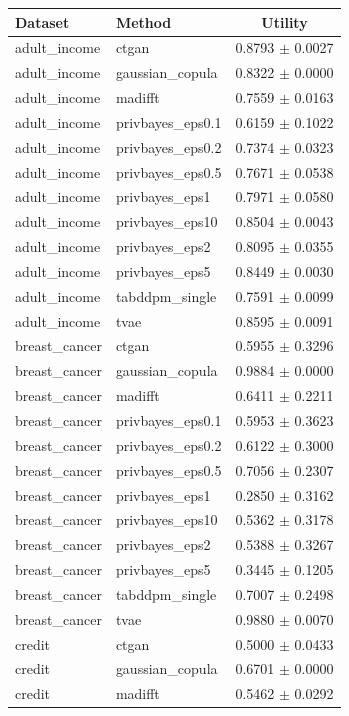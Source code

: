 \begin{tabular}{llc}
\toprule
Dataset & Method & Utility \\
\midrule
adult_income & ctgan & 0.8793 $\pm$ 0.0027 \\
adult_income & gaussian_copula & 0.8322 $\pm$ 0.0000 \\
adult_income & madifft & 0.7559 $\pm$ 0.0163 \\
adult_income & privbayes_eps0.1 & 0.6159 $\pm$ 0.1022 \\
adult_income & privbayes_eps0.2 & 0.7374 $\pm$ 0.0323 \\
adult_income & privbayes_eps0.5 & 0.7671 $\pm$ 0.0538 \\
adult_income & privbayes_eps1 & 0.7971 $\pm$ 0.0580 \\
adult_income & privbayes_eps10 & 0.8504 $\pm$ 0.0043 \\
adult_income & privbayes_eps2 & 0.8095 $\pm$ 0.0355 \\
adult_income & privbayes_eps5 & 0.8449 $\pm$ 0.0030 \\
adult_income & tabddpm_single & 0.7591 $\pm$ 0.0099 \\
adult_income & tvae & 0.8595 $\pm$ 0.0091 \\
breast_cancer & ctgan & 0.5955 $\pm$ 0.3296 \\
breast_cancer & gaussian_copula & 0.9884 $\pm$ 0.0000 \\
breast_cancer & madifft & 0.6411 $\pm$ 0.2211 \\
breast_cancer & privbayes_eps0.1 & 0.5953 $\pm$ 0.3623 \\
breast_cancer & privbayes_eps0.2 & 0.6122 $\pm$ 0.3000 \\
breast_cancer & privbayes_eps0.5 & 0.7056 $\pm$ 0.2307 \\
breast_cancer & privbayes_eps1 & 0.2850 $\pm$ 0.3162 \\
breast_cancer & privbayes_eps10 & 0.5362 $\pm$ 0.3178 \\
breast_cancer & privbayes_eps2 & 0.5388 $\pm$ 0.3267 \\
breast_cancer & privbayes_eps5 & 0.3445 $\pm$ 0.1205 \\
breast_cancer & tabddpm_single & 0.7007 $\pm$ 0.2498 \\
breast_cancer & tvae & 0.9880 $\pm$ 0.0070 \\
credit & ctgan & 0.5000 $\pm$ 0.0433 \\
credit & gaussian_copula & 0.6701 $\pm$ 0.0000 \\
credit & madifft & 0.5462 $\pm$ 0.0292 \\

\end{tabular}
